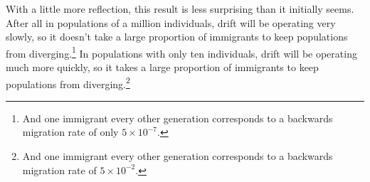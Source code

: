 \documentclass[12pt]{article}
\begin{document}
With a little more reflection, this result is less surprising than it
initially seems. After all in populations of a million individuals,
drift will be operating very slowly, so it doesn't take a large
proportion of immigrants to keep populations from
diverging.\footnote{And one immigrant every other generation
  corresponds to a backwards migration rate of only $5\times
  10^{-7}$.} In populations with only ten individuals, drift will be
operating much more quickly, so it takes a large proportion of
immigrants to keep populations from diverging.\footnote{And one
  immigrant every other generation corresponds to a backwards
  migration rate of $5 \times 10^{-2}$.}

\ccLicense
\end{document}

